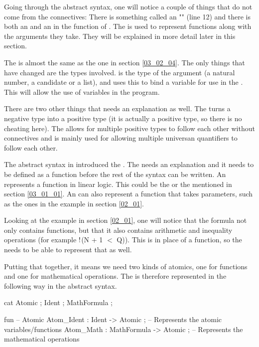 Going through the abstract syntax, one will notice a couple of things that do not come from the connectives: There is something called an "" (line 12) and there is both an  and an  in the function of . The  is used to represent functions along with the arguments they take. They will be explained in more detail later in this section.

The  is almost the same as the one in section \ref{03_02_04}. The only things that have changed are the types involved.  is the type of the argument (a natural number, a candidate or a list), and  uses this  to bind a variable for use in the . This will allow the use of variables in the program.

There are two other things that needs an explanation as well. The  turns a negative type into a positive type (it is actually a positive type, so there is no cheating here). The  allows for multiple positive types to follow each other without connectives and is mainly used for allowing multiple universan quantifiers to follow each other.

The abstract syntax in  introduced the . The  needs an explanation and it needs to be defined as a function before the rest of the syntax can be written. An  represents a function in linear logic. This could be the  or the  mentioned in section \ref{03_01_01}. An  can also represent a function that takes parameters, such as the ones in the example in section \ref{02_01}.

Looking at the example in section \ref{02_01}, one will notice that the formula not only contains functions, but that it also contains arithmetic and inequality operations (for example  $\mathord{\text{\rm !}}$(N + 1 $<$ Q)). This is in place of a function, so the  needs to be able to represent that as well.

Putting that together, it means we need two kinds of atomics, one for functions and one for mathematical operations. The  is therefore represented in the following way in the abstract syntax.

\begin{lstgf}
    cat
        Atomic ; Ident ; MathFormula ;

    fun
        -- Atomic
        Atom_Ident : Ident -> Atomic ;          -- Represents the atomic variables/functions
        Atom_Math : MathFormula -> Atomic ;     -- Represents the mathematical operations
\end{lstgf}

